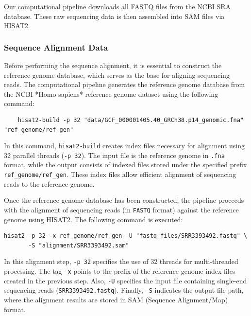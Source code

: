 \documentclass{article}
\begin{document}
Our computational pipeline downloads all FASTQ files from the NCBI SRA database. These raw sequencing data is then assembled into SAM files via HISAT2.

\subsubsection{Sequence Alignment Data}  
Before performing the sequence alignment, it is essential to construct the reference genome database, which serves as the base for aligning sequencing reads. The computational pipeline generates the reference genome database from the NCBI *Homo sapiens* reference genome dataset using the following command:

\begin{verbatim}
    hisat2-build -p 32 "data/GCF_000001405.40_GRCh38.p14_genomic.fna" "ref_genome/ref_gen"
\end{verbatim}

In this command, \texttt{hisat2-build} creates index files necessary for alignment using 32 parallel threads (\texttt{-p 32}). The input file is the reference genome in \texttt{.fna} format, while the output consists of indexed files stored under the specified prefix \texttt{ref\_genome/ref\_gen}. These index files allow efficient alignment of sequencing reads to the reference genome.

Once the reference genome database has been constructed, the pipeline proceeds with the alignment of sequencing reads (in \texttt{FASTQ} format) against the reference genome using HISAT2. The following command is executed:

\begin{verbatim}
hisat2 -p 32 -x ref_genome/ref_gen -U "fastq_files/SRR3393492.fastq" \
       -S "alignment/SRR3393492.sam"
\end{verbatim}
In this alignment step, \texttt{-p 32} specifies the use of 32 threads for multi-threaded processing. The tag \texttt{-x} points to the prefix of the reference genome index files created in the previous step. Also, \texttt{-U} specifies the input file containing single-end sequencing reads (\texttt{SRR3393492.fastq}). Finally, \texttt{-S} indicates the output file path, where the alignment results are stored in SAM (Sequence Alignment/Map) format.
\end{document}
